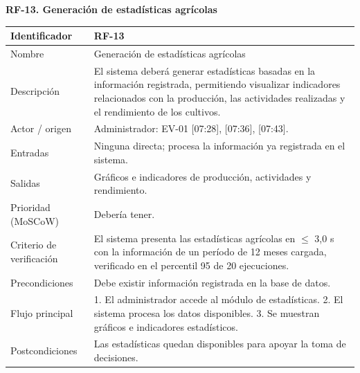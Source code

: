 \documentclass[12pt,a4paper]{article}
\begin{document}
\begin{minipage}{\linewidth}
\bigskip
\noindent\textbf{RF-13. Generación de estadísticas agrícolas}
\label{tab:RF-13}

\begin{center}
\begin{tabular}{|p{3.5cm}|p{10.7cm}|}
\hline
Identificador & RF-13 \\
\hline
Nombre & Generación de estadísticas agrícolas \\
\hline
Descripción & El sistema deberá generar estadísticas basadas en la información registrada, permitiendo visualizar indicadores relacionados con la producción, las actividades realizadas y el rendimiento de los cultivos. \\
\hline
Actor / origen & Administrador: EV-01 [07:28], [07:36], [07:43]. \\
\hline
Entradas & Ninguna directa; procesa la información ya registrada en el sistema. \\
\hline
Salidas & Gráficos e indicadores de producción, actividades y rendimiento. \\
\hline
Prioridad (MoSCoW) & Debería tener. \\
\hline
Criterio de verificación & El sistema presenta las estadísticas agrícolas en $\leq$ 3,0 s con la información de un período de 12 meses cargada, verificado en el percentil 95 de 20 ejecuciones. \\
\hline
Precondiciones & Debe existir información registrada en la base de datos. \\
\hline
Flujo principal & 1. El administrador accede al módulo de estadísticas. 2. El sistema procesa los datos disponibles. 3. Se muestran gráficos e indicadores estadísticos. \\
\hline
Postcondiciones & Las estadísticas quedan disponibles para apoyar la toma de decisiones. \\
\hline
\end{tabular}
\end{center}
\end{minipage}
\end{document}
